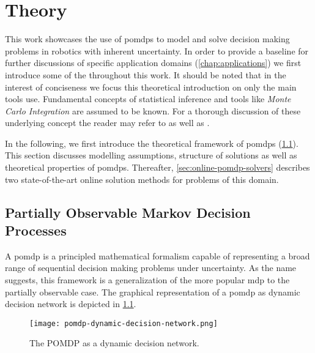 \chapter{Theory}

This work showcases the use of \glspl{pomdp} to model and solve decision making
problems in robotics with inherent uncertainty. In order to provide a baseline
for further discussions of specific application domains
(\cref{chap:applications}) we first introduce some of the throughout this work.
It should be noted that in the interest of conciseness we focus this
theoretical introduction on only the main tools use. Fundamental concepts of
statistical inference and tools like \textit{Monte Carlo Integration} are
assumed to be known. For a thorough discussion of these underlying concept the
reader may refer to \cite{kochenderfer2015decision} as well as
\cite{probRobotics}.

In the following, we first introduce the theoretical framework of \glspl{pomdp}
(\cref{sec:pomdp}). This section discusses modelling assumptions, structure
of solutions as well as theoretical properties of \glspl{pomdp}. Thereafter,
\cref{sec:online-pomdp-solvers} describes two state-of-the-art online solution
methods for problems of this domain.

\section{Partially Observable Markov Decision Processes}\label{sec:pomdp}

A \acf{pomdp} is a principled mathematical formalism capable of representing
a broad range of sequential decision making problems under uncertainty. As the
name suggests, this framework is a generalization of the more popular \ac{mdp}
to the partially observable case. The graphical representation of a \ac{pomdp}
as dynamic decision network is depicted in \cref{fig:pomdp}.

\begin{figure}[htpb]
  \centering
  \texttt{[image: pomdp-dynamic-decision-network.png]}
  \caption{The POMDP as a dynamic decision network. }
  \label{fig:pomdp}
\end{figure}


